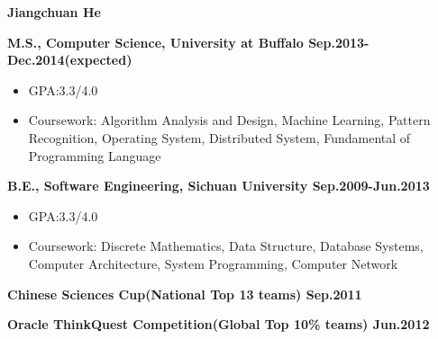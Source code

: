 \documentclass{myres}
\begin{document}
{\LARGE \bf Jiangchuan He}
\myline

{

}

{\textbf{M.S., Computer Science, University at Buffalo \hfill Sep.2013-Dec.2014(expected)} 		
\begin{itemize}[topsep=0pt, leftmargin=0.2in] \itemsep -5pt
	\item[]GPA:3.3/4.0
	\item[]Coursework: Algorithm Analysis and Design, Machine Learning, Pattern Recognition, Operating System, Distributed System,
		Fundamental of Programming Language
\end{itemize}
\par
\smallskip
\textbf{B.E., Software Engineering, Sichuan University \hfill Sep.2009-Jun.2013} 		
\begin{itemize}[topsep=0pt, leftmargin=0.2in] \itemsep -5pt
	\item[]GPA:3.3/4.0
	\item[]Coursework: Discrete Mathematics, Data Structure, Database Systems, Computer Architecture, System Programming,
		Computer Network
\end{itemize}

}
{
 	\textbf{Chinese Sciences Cup(National Top 13 teams) \hfill Sep.2011}
	\par
	\textbf{Oracle ThinkQuest Competition(Global Top 10\% teams) \hfill  Jun.2012}
}
\end{document}
